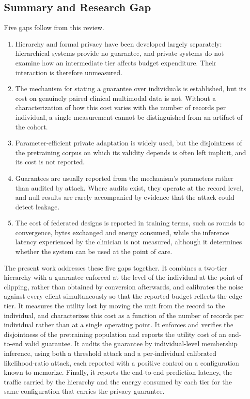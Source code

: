 \subsection{Summary and Research Gap}

Five gaps follow from this review.
\begin{enumerate}
\item Hierarchy and formal privacy have
been developed largely separately: hierarchical systems provide no guarantee,
and private systems do not examine how an intermediate tier affects budget
expenditure. Their interaction is therefore unmeasured.
\item The mechanism
for stating a guarantee over individuals is established, but its cost on
genuinely paired clinical multimodal data is not. Without a characterization of
how this cost varies with the number of records per individual, a single
measurement cannot be distinguished from an artifact of the cohort.
\item Parameter-efficient private adaptation is widely used, but the disjointness of
the pretraining corpus on which its validity depends is often left implicit,
and its cost is not reported.
\item Guarantees are usually reported from the
mechanism's parameters rather than audited by attack. Where audits exist, they
operate at the record level, and null results are rarely accompanied by
evidence that the attack could detect leakage.
\item The cost of federated
designs is reported in training terms, such as rounds to convergence, bytes
exchanged and energy consumed, while the inference latency experienced by the
clinician is not measured, although it determines whether the system can be
used at the point of care.
\end{enumerate}

The present work addresses these five gaps together. It combines a two-tier
hierarchy with a guarantee enforced at the level of the individual at the point
of clipping, rather than obtained by conversion afterwards, and calibrates the
noise against every client simultaneously so that the reported budget reflects
the edge tier. It measures the utility lost by moving the unit from the record
to the individual, and characterizes this cost as a function of the number of
records per individual rather than at a single operating point. It enforces
and verifies the disjointness of the pretraining population and reports the
utility cost of an end-to-end valid guarantee. It audits the guarantee by
individual-level membership inference, using both a threshold attack and a
per-individual calibrated likelihood-ratio attack, each reported with a
positive control on a configuration known to memorize. Finally, it reports the
end-to-end prediction latency, the traffic carried by the hierarchy and the
energy consumed by each tier for the same configuration that carries the
privacy guarantee.
